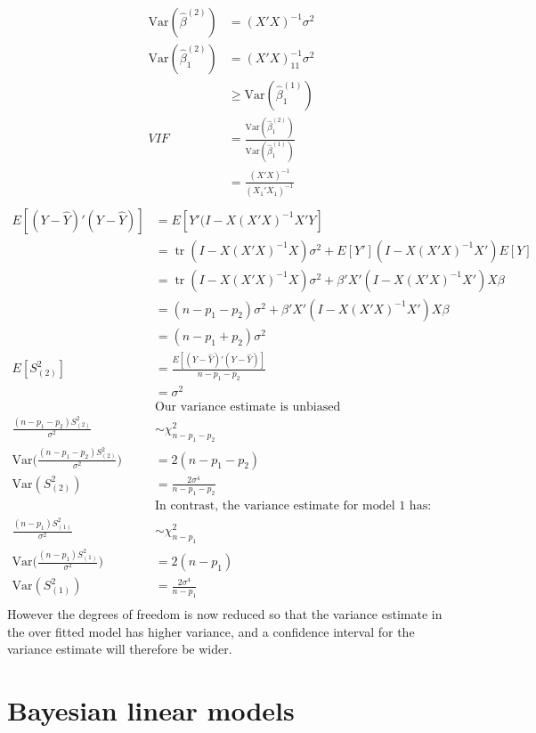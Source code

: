 \documentclass[12pt]{article}\usepackage{graphicx, color}
\theoremstyle{definition}
\newcommand{\Var}{\mathrm{Var}}
\renewcommand{\hat}{\widehat}
\DeclareMathOperator{\tr}{tr}
\begin{document}
\begin{align*}
\Var(\hat \beta^{(2)})&=(X'X)^{-1}\sigma^2\\
\Var(\hat \beta_1^{(2)})&=(X'X)_{11}^{-1}\sigma^2\\
&\geq \Var(\hat \beta_1^{(1)})\\
VIF&=\frac{\Var(\hat \beta_1^{(2)})}{\Var(\hat \beta_1^{(1)})}\\
&=\frac{(X'X)^{-1}}{(X_1'X_1)^{-1}}\\
\end{align*}
\begin{align*}E[(Y-\hat Y)'(Y-\hat Y)]&= E[Y'(I-X(X'X)^{-1}X'Y]\\
&= \tr(I-X(X'X)^{-1}X)\sigma^2+E[Y'](I-X(X'X)^{-1}X')E[Y]\\
&= \tr(I-X(X'X)^{-1}X)\sigma^2+\beta'X'(I-X(X'X)^{-1}X')X\beta\\
&= (n-p_1-p_2)\sigma^2+\beta'X'(I-X(X'X)^{-1}X')X\beta\\
&= (n-p_1+p_2)\sigma^2\\
E[S_{(2)}^2]&=\frac{E[(Y-\hat Y)'(Y-\hat Y)]}{n-p_1-p_2}\\
&=\sigma^2\\
&\text{Our variance estimate is unbiased}\\
\frac{(n-p_1-p_2)S_{(2)}^2}{\sigma^2}&\sim \chi^2_{n-p_1-p_2}\\
\Var\big(\frac{(n-p_1-p_2)S_{(2)}^2}{\sigma^2}\big)&=2(n-p_1-p_2)\\
\Var(S_{(2)}^2)&=\frac{2\sigma^4}{n-p_1-p_2}\\
&\text{In contrast, the variance estimate for model 1 has:}\\
\frac{(n-p_1)S_{(1)}^2}{\sigma^2}&\sim \chi^2_{n-p_1}\\
\Var\big(\frac{(n-p_1)S_{(1)}^2}{\sigma^2}\big)&=2(n-p_1)\\
\Var(S_{(1)}^2)&=\frac{2\sigma^4}{n-p_1}\\
\end{align*}
However the degrees of freedom is now reduced so that the variance estimate in the over fitted model has higher variance, and a confidence interval for the variance estimate will therefore be wider.
\section{Bayesian linear models}
\end{document}

